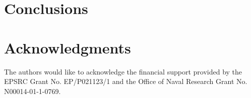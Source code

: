 \documentclass[10pt,aps,onecolumn,superscriptaddress]{revtex4-2}
\begin{document}
\section{Conclusions}
\label{sec:conclusion}

\section*{Acknowledgments}
The authors would like to acknowledge the financial support provided by the EPSRC Grant No. EP/P021123/1 and the Office of Naval Research Grant No. N00014-01-1-0769.


\end{document}
